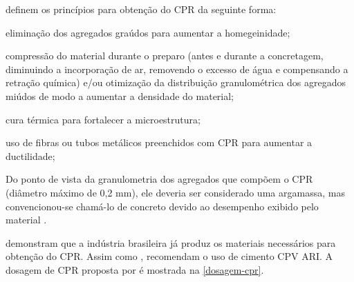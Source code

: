 definem os princípios para obtenção do CPR da seguinte forma:

\begin{alineas}[label=\textbullet]
  \item eliminação dos agregados graúdos para aumentar a homegeinidade;
  \item compressão do material durante o preparo (antes e durante a concretagem, diminuindo a incorporação de ar, removendo o excesso de água e compensando a retração química) e/ou otimização da distribuição granulométrica dos agregados miúdos de modo a aumentar a densidade do material;
  \item cura térmica para fortalecer a microestrutura;
  \item uso de fibras ou tubos metálicos preenchidos com CPR para aumentar a ductilidade;
\end{alineas}

Do ponto de vista da granulometria dos agregados que compõem o CPR (diâmetro máximo de 0,2 mm), ele deveria ser considerado uma argamassa, mas convencionou-se chamá-lo de concreto devido ao desempenho exibido pelo material \cite[p.~1313]{Tutikian}.

 demonstram que a indústria brasileira já produz os materiais necessários para obtenção do CPR. Assim como ,  recomendam o uso de cimento CPV ARI. A dosagem de CPR proposta por  é mostrada na \autoref{dosagem-cpr}.

\begin{table}[htb]
\end{table}

